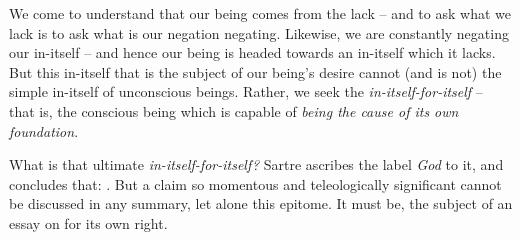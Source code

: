 We come to understand that our being comes from the lack -- and to ask what we lack is to ask what is our negation negating. Likewise, we are constantly negating our in-itself -- and hence our being is headed towards an in-itself which it lacks.  But this in-itself that is the subject of our being's desire cannot (and is not) the simple in-itself of unconscious beings. Rather, we seek the \emph{in-itself-for-itself} -- that is, the conscious being which is capable of \emph{being the cause of its own foundation}. 

What is that ultimate \emph{in-itself-for-itself?} Sartre ascribes the label \emph{God} to it, and concludes that: . But a claim so momentous and teleologically significant cannot be discussed in any summary, let alone this epitome. It must be, the subject of an essay on for its own right.